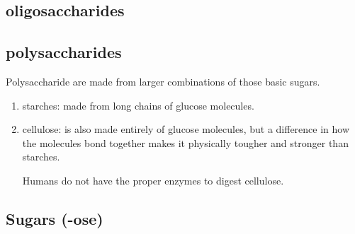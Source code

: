 \subsection{oligosaccharides}
\label{sec:oligosaccharide}

\subsection{polysaccharides}
\label{sec:polysaccharide}

Polysaccharide are made from larger combinations of those basic sugars. 
\begin{enumerate}
  \item starches:  made from long chains of glucose molecules. 
  
  \item cellulose: is also made entirely of glucose molecules, but a difference
  in how the molecules bond together makes it physically tougher and stronger
  than starches.
  
Humans do not have the proper enzymes to digest cellulose.

\end{enumerate}

\subsection{Sugars (-ose)}
\label{sec:sugar}	
\label{sec:ribofuranose}

